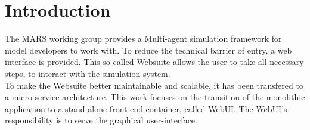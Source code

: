 
\chapter{Introduction}
The MARS working group provides a Multi-agent simulation framework for model developers to work with. To reduce the technical barrier of entry, a web interface is provided. This  so called Websuite allows the user to take all necessary steps, to interact with the simulation system.\\
To make the Websuite better maintainable and scalable, it has been transfered to a micro-service architecture. This work focuses on the transition of the monolithic application to a stand-alone front-end container, called WebUI. The WebUI's responsibility is to serve the graphical user-interface.
